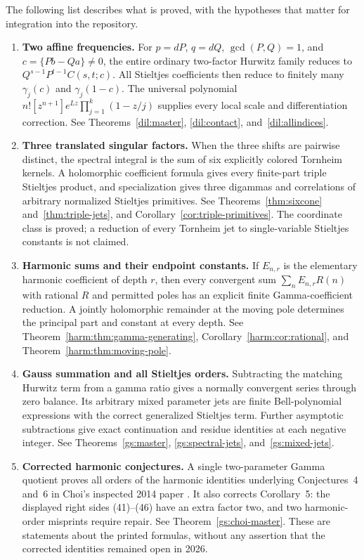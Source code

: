 The following list describes what is proved, with the hypotheses that
matter for integration into the repository.
\begin{enumerate}
\item \textbf{Two affine frequencies.}
For $p=dP$, $q=dQ$, $\gcd(P,Q)=1$, and
$c=\{Pb-Qa\}\ne0$, the entire ordinary two-factor Hurwitz family reduces
to $Q^{s-1}P^{t-1}C(s,t;c)$.  All Stieltjes coefficients then reduce
to finitely many $\gamma_j(c)$ and $\gamma_j(1-c)$.  The universal
polynomial $n![z^{n+1}]e^{Lz}\prod_{j=1}^k(1-z/j)$ supplies every local
scale and differentiation correction.  See Theorems~\ref{dil:master},
\ref{dil:contact}, and~\ref{dil:allindices}.
\item \textbf{Three translated singular factors.}
When the three shifts are pairwise distinct, the spectral integral
is the sum of six explicitly colored Tornheim kernels.  A holomorphic
coefficient formula gives every finite-part triple Stieltjes product,
and specialization gives three digammas and correlations of arbitrary
normalized Stieltjes primitives.  See Theorems~\ref{thm:sixcone}
and~\ref{thm:triple-jets}, and Corollary~\ref{cor:triple-primitives}.
The coordinate class is proved; a reduction of every Tornheim jet to
single-variable Stieltjes constants is not claimed.
\item \textbf{Harmonic sums and their endpoint constants.}
If $E_{n,r}$ is the elementary harmonic coefficient of depth $r$, then
every convergent sum $\sum_nE_{n,r}R(n)$ with rational $R$ and permitted
poles has an explicit finite Gamma-coefficient reduction.  A jointly
holomorphic remainder at the moving pole determines the principal part
and constant at every depth.  See Theorem~\ref{harm:thm:gamma-generating},
Corollary~\ref{harm:cor:rational}, and
Theorem~\ref{harm:thm:moving-pole}.
\item \textbf{Gauss summation and all Stieltjes orders.}
Subtracting the matching Hurwitz term from a gamma ratio gives a normally
convergent series through zero balance.  Its arbitrary mixed parameter
jets are finite Bell-polynomial expressions with the correct generalized
Stieltjes term.  Further asymptotic subtractions give exact continuation
and residue identities at each negative integer.  See
Theorems~\ref{gs:master}, \ref{gs:spectral-jets}, and~\ref{gs:mixed-jets}.
\item \textbf{Corrected harmonic conjectures.}
A single two-parameter Gamma quotient proves all orders of the harmonic
identities underlying Conjectures~4 and~6 in Choi's inspected 2014
paper \cite{gs:Choi}.  It also corrects Corollary~5: the displayed
right sides (41)--(46) have an extra factor two, and two harmonic-order
misprints require repair.  See Theorem~\ref{gs:choi-master}.
These are statements about the printed formulas, without any assertion
that the corrected identities remained open in 2026.
\end{enumerate}

